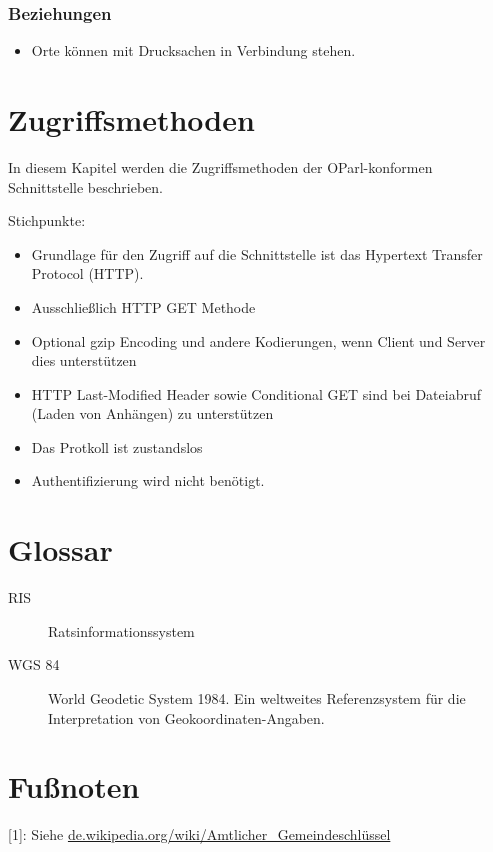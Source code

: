 \documentclass[,a4paper]{article}
\begin{document}
\subsubsection{Beziehungen}

\begin{itemize}
\item
  Orte können mit Drucksachen in Verbindung stehen.
\end{itemize}

\section{Zugriffsmethoden}

In diesem Kapitel werden die Zugriffsmethoden der OParl-konformen
Schnittstelle beschrieben.

Stichpunkte:

\begin{itemize}
\item
  Grundlage für den Zugriff auf die Schnittstelle ist das Hypertext
  Transfer Protocol (HTTP).
\item
  Ausschließlich HTTP GET Methode
\item
  Optional gzip Encoding und andere Kodierungen, wenn Client und Server
  dies unterstützen
\item
  HTTP Last-Modified Header sowie Conditional GET sind bei Dateiabruf
  (Laden von Anhängen) zu unterstützen
\item
  Das Protkoll ist zustandslos
\item
  Authentifizierung wird nicht benötigt.
\end{itemize}

\section{Glossar}

\begin{description}
\item[RIS]
Ratsinformationssystem
\item[WGS 84]
World Geodetic System 1984. Ein weltweites Referenzsystem für die
Interpretation von Geokoordinaten-Angaben.
\end{description}

\section{Fußnoten}

{[}1{]}: Siehe
\href{http://de.wikipedia.org/wiki/Amtlicher\_Gemeindeschl\%C3\%BCssel}{de.wikipedia.org/wiki/Amtlicher\_Gemeindeschlüssel}
\end{document}
